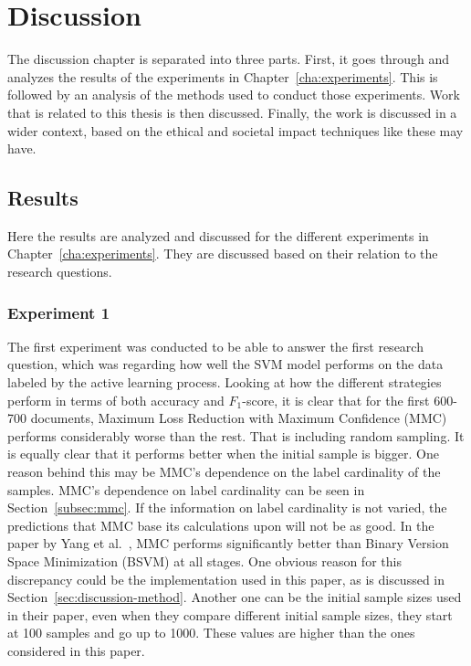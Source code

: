\chapter{Discussion}
\label{cha:discussion}

The discussion chapter is separated into three parts.
First, it goes through and analyzes the results of the experiments in Chapter~\ref{cha:experiments}.
This is followed by an analysis of the methods used to conduct those experiments.
Work that is related to this thesis is then discussed.
Finally, the work is discussed in a wider context, based on the ethical and societal impact techniques like these may have.

\section{Results}
\label{sec:discussion-results}

Here the results are analyzed and discussed for the different experiments in Chapter~\ref{cha:experiments}.
They are discussed based on their relation to the research questions.

\subsection{Experiment 1}

The first experiment was conducted to be able to answer the first research question, which was regarding how well the SVM model performs on the data labeled by the active learning process.
Looking at how the different strategies perform in terms of both accuracy and $F_1$-score, it is clear that for the first 600-700 documents, Maximum Loss Reduction with Maximum Confidence (MMC) performs considerably worse than the rest.
That is including random sampling.
It is equally clear that it performs better when the initial sample is bigger.
One reason behind this may be MMC's dependence on the label cardinality of the samples.
MMC's dependence on label cardinality can be seen in Section~\ref{subsec:mmc}.
If the information on label cardinality is not varied, the predictions that MMC base its calculations upon will not be as good.
In the paper by Yang et al\@.~\cite{yang2009effective}, MMC performs significantly better than Binary Version Space Minimization (BSVM) at all stages.
One obvious reason for this discrepancy could be the implementation used in this paper, as is discussed in Section~\ref{sec:discussion-method}.
Another one can be the initial sample sizes used in their paper, even when they compare different initial sample sizes, they start at 100 samples and go up to 1000.
These values are higher than the ones considered in this paper.

